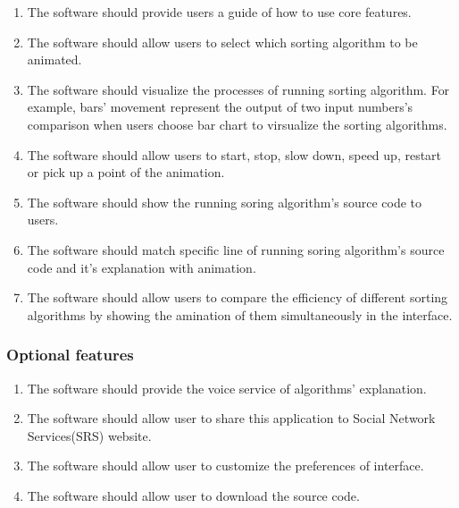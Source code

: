 \documentclass[12pt]{article}
\begin{document}
\begin{enumerate}
\item The software should provide users a guide of how to use core features.  

\item The software should allow users to select which sorting algorithm to be animated.

\item The software should visualize the processes of running sorting algorithm. For example, bars' movement represent the output of two input numbers's comparison when users choose bar chart to virsualize the sorting algorithms. 

\item The software should allow users to start, stop, slow down, speed up, restart or pick up a point of the animation.

\item The software should show the running soring algorithm’s source code to users.

\item The software should match specific line of running soring algorithm’s source code and it's explanation with animation.

\item The software should allow users to compare the efficiency of different sorting algorithms by showing the amination of them simultaneously in the interface.


\end{enumerate}

\subsubsection{Optional features}
\label{subsubsec:optl feat}

\begin{enumerate}
\item The software should provide the voice service of algorithms’ explanation. 

\item The software should allow user to share this application to Social Network Services(SRS) website.

\item The software should allow user to customize the preferences of interface.   

\item The software should allow user to download the source code.

\end{enumerate}
\end{document}
